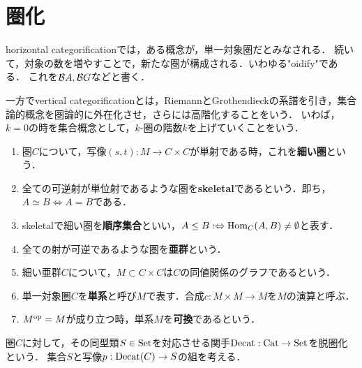 \documentclass[uplatex,dvipdfmx]{jsreport}
\begin{document}
\section{圏化}

\begin{tcolorbox}[colframe=ForestGreen, colback=ForestGreen!10!white, breakable ,colbacktitle=ForestGreen!40!white, coltitle=black,fonttitle=\bfseries\sffamily,
    title=Horizontal and Vertical categorification]
    horizontal categorificationでは，ある概念が，単一対象圏だとみなされる．
    続いて，対象の数を増やすことで，新たな圏が構成される．いわゆる"oidify"である．
    これを$\mathcal{B} A,\mathcal{B} G$などと書く．
    
    一方でvertical categorificationとは，RiemannとGrothendieckの系譜を引き，集合論的概念を圏論的に外在化させ，さらには高階化することをいう．
    いわば，$k=0$の時を集合概念として，$k$-圏の階数$k$を上げていくことをいう．
\end{tcolorbox}

\begin{definition}\mbox{}
    \begin{enumerate}
        \item 圏$C$について，写像$(s,t):M\to C\times C$が単射である時，これを\textbf{細い圏}という．
        \item 全ての可逆射が単位射であるような圏を\textbf{skeletal}であるという．即ち，$A\simeq B\Leftrightarrow A=B$である．
        \item skeletalで細い圏を\textbf{順序集合}といい，$A\le B:\Leftrightarrow \mathrm{Hom}_C(A,B)\ne\emptyset$と表す．
        \item 全ての射が可逆であるような圏を\textbf{亜群}という．
        \item 細い亜群$C$について，$M\subset C\times C$は$C$の同値関係のグラフであるという．
        \item 単一対象圏$C$を\textbf{単系}と呼び$M$で表す．合成$c:M\times M\to M$を$M$の演算と呼ぶ．
        \item $M^{\mathrm{op}}=M$が成り立つ時，単系$M$を\textbf{可換}であるという．
    \end{enumerate}
\end{definition}

\begin{definition}[decategorification]
    圏$C$に対して，その同型類$S\in\mathrm{Set}$を対応させる関手$\mathrm{Decat}:\mathrm{Cat}\to\mathrm{Set}$を脱圏化という．
    集合$S$と写像$p:\mathrm{Decat}(C)\to S$の組を考える．
\end{definition}
\end{document}
